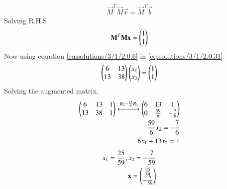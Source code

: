$$\begin{align}
\vec{M}^T\vec{M}\vec{x} = \vec{M}^T\vec{b}
\end{align}
Solving R.H.S
\begin{align}
\vec{M}^T\vec{M}\vec{x} =\myvec{1\\1}\label{eq:solutions/3/1/2.0.31}
\end{align}
Now using equation \eqref{eq:solutions/3/1/2.0.6} in \eqref{eq:solutions/3/1/2.0.31}
\begin{align}
\myvec{6&13\\13&38}\myvec{x_1\\x_2}=\myvec{1\\1}
\end{align}
Solving the augmented matrix.
\begin{align}
\myvec{6&13&1\\13&38&1} \xleftrightarrow{R_2-{\frac{13}{6}}R_1}\myvec{6&13&1\\0&\frac{59}{6}&-\frac{7}{6}}\\
\frac{59}{6}x_2=-\frac{7}{6}\\
6x_1+13x_2=1
\end{align}
\begin{align}
x_1= \frac{25}{59},
x_2=-\frac{7}{59}\\
\vec{x}=\myvec{\frac{25}{59}\\-\frac{7}{59}}
\end{align}
